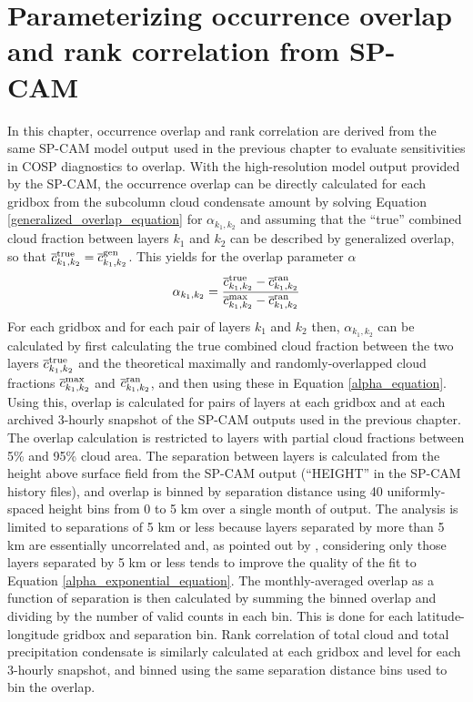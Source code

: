 \section{Parameterizing occurrence overlap and rank correlation from SP-CAM}
\label{subgrid2_overlap_section}
In this chapter, occurrence overlap and rank correlation are derived from the same SP-CAM model output used in the previous chapter to evaluate sensitivities in COSP diagnostics to overlap. With the high-resolution model output provided by the SP-CAM, the occurrence overlap can be directly calculated for each gridbox from the subcolumn cloud condensate  amount by solving Equation \ref{generalized_overlap_equation} for $\alpha_{k_1, k_2}$ and assuming that the ``true'' combined cloud fraction between layers $k_1$ and $k_2$ can be described by generalized overlap, so that $\overline{c}^{\rm true}_{k_1, k_2} = \overline{c}^{\rm gen}_{k_1, k_2}$. This yields for the overlap parameter $\alpha$
\begin{gather}
    \alpha_{k_1, k_2} = \frac{
        \overline{c}^{\rm true}_{k_1, k_2} - \overline{c}^{\rm ran}_{k_1, k_2}
    }{
        \overline{c}^{\rm max}_{k_1, k_2} - \overline{c}^{\rm ran}_{k_1, k_2}
    }
    \label{alpha_equation}
\end{gather}
For each gridbox and for each pair of layers $k_1$ and $k_2$ then, $\alpha_{k_1, k_2}$ can be calculated by first calculating the true combined cloud fraction between the two layers $\overline{c}^{\rm true}_{k_1, k_2}$ and the theoretical maximally and randomly-overlapped cloud fractions $\overline{c}^{\rm max}_{k_1, k_2}$ and $\overline{c}^{\rm ran}_{k_1, k_2}$, and then using these in Equation \ref{alpha_equation}. Using this, overlap is calculated for pairs of layers at each gridbox and at each archived 3-hourly snapshot of the SP-CAM outputs used in the previous chapter. The overlap calculation is restricted to layers with partial cloud fractions between 5\% and 95\% cloud area. The separation between layers is calculated from the height above surface field from the SP-CAM output (``HEIGHT'' in the SP-CAM history files), and overlap is binned by separation distance using 40 uniformly-spaced height bins from 0 to 5 km over a single month of output. The analysis is limited to separations of 5 km or less because layers separated by more than 5 km are essentially uncorrelated and, as pointed out by \cite{pincus_et_al_2005}, considering only those layers separated by 5 km or less tends to improve the quality of the fit to Equation \ref{alpha_exponential_equation}. The monthly-averaged overlap as a function of separation is then calculated by summing the binned overlap and dividing by the number of valid counts in each bin. This is done for each latitude-longitude gridbox and separation bin. Rank correlation of total cloud and total precipitation condensate is similarly calculated at each gridbox and level for each 3-hourly snapshot, and binned using the same separation distance bins used to bin the overlap. 


